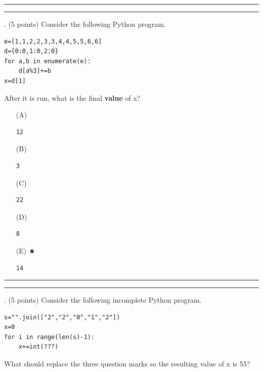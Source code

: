 \documentclass{article}
\newcounter{question}
\begin{document}
\vspace*{2em}
\hrule
\vspace{2em}

\vspace{2em}
\hrule height 2pt


\newpage
{}. (5 points)
Consider the following Python program.
\begin{verbatim}
e=[1,1,2,2,3,3,4,4,5,5,6,6]
d={0:0,1:0,2:0}
for a,b in enumerate(e):
    d[a%3]+=b
x=d[1]
\end{verbatim}
After it is run, what is the final \textbf{value} of x?


\begin{enumerate}
\item[(A)]
\begin{verbatim}12\end{verbatim}

\item[(B)]
\begin{verbatim}3\end{verbatim}

\item[(C)]
\begin{verbatim}22\end{verbatim}

\item[(D)]
\begin{verbatim}8\end{verbatim}

\item[(E)] $\bigstar$ 
\begin{verbatim}14\end{verbatim}

\end{enumerate}

\vspace*{2em}
\hrule
\vspace{2em}

\vspace{2em}
\hrule height 2pt


\newpage
{}. (5 points)
Consider the following incomplete Python program.
\begin{verbatim}
s="".join(["2","2","0","1","2"])
x=0
for i in range(len(s)-1):
    x+=int(???)
\end{verbatim}
What should replace the three question marks so the resulting value of x is 55?
\end{document}

